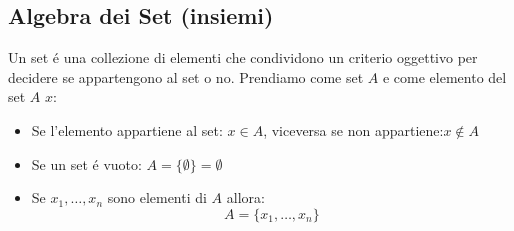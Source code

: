     \subsection{Algebra dei Set (insiemi)}
        Un set é una collezione di elementi che condividono un criterio oggettivo per decidere se appartengono al set o no. Prendiamo come set $A$ e come 
        elemento del set $A$ $x$:
        \begin{itemize}
            \item {Se l'elemento appartiene al set: $x\in A$, viceversa se non appartiene:$x\notin A$}
            \item {Se un set é vuoto: $A=\{\emptyset\}=\emptyset$}
            \item {Se $x_1, \dots, x_n$ sono elementi di $A$ allora:
                \[
                    A=\{x_1, \dots, x_n \}
                \]
            }
        \end{itemize}
